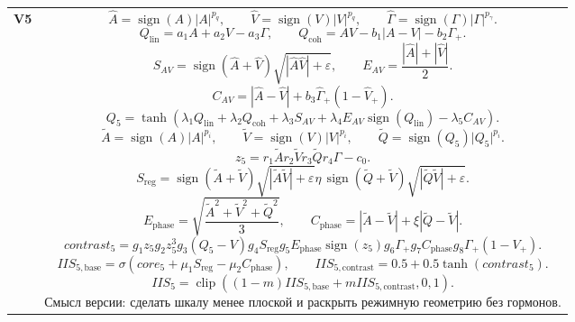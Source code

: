 \documentclass[12pt,a4paper]{article}
\newcommand{\sgn}{\operatorname{sign}}
\newcommand{\clip}{\operatorname{clip}}
\newcommand{\spow}[2]{\sgn(#1)\lvert #1 \rvert^{#2}}
\begin{document}
\begin{landscape}
\begin{longtable}{>{\raggedright\arraybackslash}p{1.6cm} >{\raggedright\arraybackslash}p{16.7cm}}
\textbf{V5} &
\[
\widehat{A}=\spow{A}{p_q}, \qquad
\widehat{V}=\spow{V}{p_q}, \qquad
\widehat{\Gamma}=\spow{\Gamma}{p_\gamma}.
\]
\[
Q_{\mathrm{lin}}=a_1A+a_2V-a_3\Gamma,
\qquad
Q_{\mathrm{coh}}=AV-b_1|A-V|-b_2\Gamma_+.
\]
\[
S_{AV}=\sgn(\widehat{A}+\widehat{V})\sqrt{|\widehat{A}\widehat{V}|+\varepsilon},
\qquad
E_{AV}=\frac{|\widehat{A}|+|\widehat{V}|}{2}.
\]
\[
C_{AV}=|\widehat{A}-\widehat{V}|+b_3\widehat{\Gamma}_+(1-\widehat{V}_+).
\]
\[
Q_5=\tanh\!\left(
\lambda_1 Q_{\mathrm{lin}}+
\lambda_2 Q_{\mathrm{coh}}+
\lambda_3 S_{AV}+
\lambda_4 E_{AV}\sgn(Q_{\mathrm{lin}})-
\lambda_5 C_{AV}
\right).
\]
\[
\widetilde{A}=\spow{A}{p_i},\qquad
\widetilde{V}=\spow{V}{p_i},\qquad
\widetilde{Q}=\spow{Q_5}{p_i}.
\]
\[
z_5=
r_1\widetilde{A}
r_2\widetilde{V}
r_3\widetilde{Q}
r_4\Gamma-c_0.
\]
\[
S_{\mathrm{reg}}=
\sgn(\widetilde{A}+\widetilde{V})\sqrt{|\widetilde{A}\widetilde{V}|+\varepsilon}
\eta\,
\sgn(\widetilde{Q}+\widetilde{V})\sqrt{|\widetilde{Q}\widetilde{V}|+\varepsilon}.
\]
\[
E_{\mathrm{phase}}=\sqrt{\frac{\widetilde{A}^2+\widetilde{V}^2+\widetilde{Q}^2}{3}},
\qquad
C_{\mathrm{phase}}=|\widetilde{A}-\widetilde{V}|+\xi|\widetilde{Q}-\widetilde{V}|.
\]
\[
contrast_5=
g_1 z_5
g_2 z_5^3
g_3(Q_5-V)
g_4 S_{\mathrm{reg}}
g_5 E_{\mathrm{phase}}\sgn(z_5)
g_6 \Gamma_+
g_7 C_{\mathrm{phase}}
g_8 \Gamma_+(1-V_+).
\]
\[
IIS_{5,\mathrm{base}}=\sigma\!\left(core_5+\mu_1 S_{\mathrm{reg}}-\mu_2 C_{\mathrm{phase}}\right),
\qquad
IIS_{5,\mathrm{contrast}}=0.5+0.5\tanh(contrast_5).
\]
\[
IIS_5=\clip\!\left((1-m)IIS_{5,\mathrm{base}}+mIIS_{5,\mathrm{contrast}},0,1\right).
\]
Смысл версии: сделать шкалу менее плоской и раскрыть режимную геометрию без гормонов. \\


\end{longtable}
\end{landscape}
\end{document}
